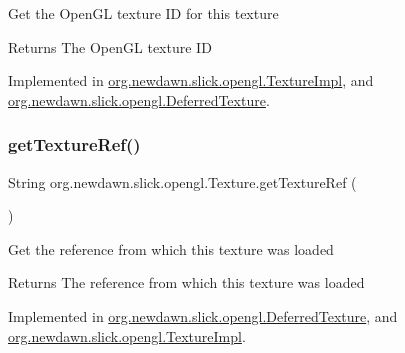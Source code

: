 Get the Open\+GL texture ID for this texture

\begin{DoxyReturn}{Returns}
The Open\+GL texture ID 
\end{DoxyReturn}


Implemented in \mbox{\hyperlink{classorg_1_1newdawn_1_1slick_1_1opengl_1_1_texture_impl_a5f9635744122138ab81a37fe44a8bcdc}{org.\+newdawn.\+slick.\+opengl.\+Texture\+Impl}}, and \mbox{\hyperlink{classorg_1_1newdawn_1_1slick_1_1opengl_1_1_deferred_texture_a20ec239f08d67ed95ed1091d402dbf9f}{org.\+newdawn.\+slick.\+opengl.\+Deferred\+Texture}}.

\mbox{\label{interfaceorg_1_1newdawn_1_1slick_1_1opengl_1_1_texture_a3082bf984c663ac388b9f5d1dc0d0074}} 
\subsubsection{\texorpdfstring{get\+Texture\+Ref()}{getTextureRef()}}
{\footnotesize\ttfamily String org.\+newdawn.\+slick.\+opengl.\+Texture.\+get\+Texture\+Ref (\begin{DoxyParamCaption}{ }\end{DoxyParamCaption})}

Get the reference from which this texture was loaded

\begin{DoxyReturn}{Returns}
The reference from which this texture was loaded 
\end{DoxyReturn}


Implemented in \mbox{\hyperlink{classorg_1_1newdawn_1_1slick_1_1opengl_1_1_deferred_texture_a063653545f11f5af27c1fdbcc25cf540}{org.\+newdawn.\+slick.\+opengl.\+Deferred\+Texture}}, and \mbox{\hyperlink{classorg_1_1newdawn_1_1slick_1_1opengl_1_1_texture_impl_a9d766e8c7e6ac8197f358066cfe418e5}{org.\+newdawn.\+slick.\+opengl.\+Texture\+Impl}}.

\mbox{\label{interfaceorg_1_1newdawn_1_1slick_1_1opengl_1_1_texture_aa85f8503feafc2f18472a4deb2a67b4e}} 
